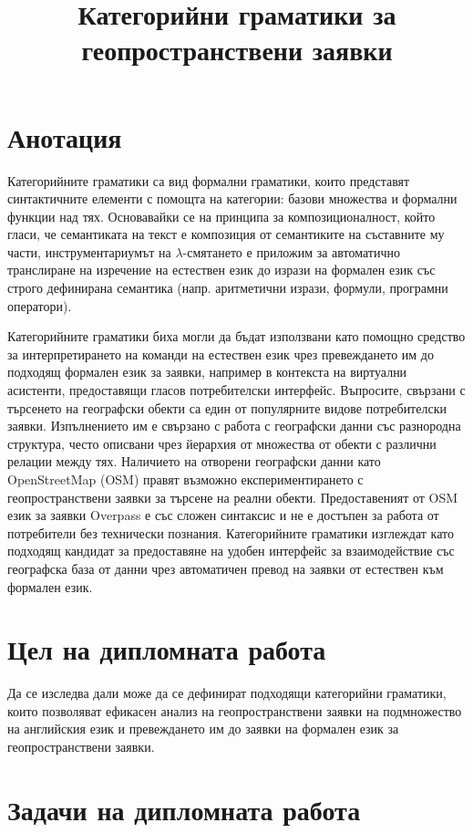 \documentclass[11pt,a4paper]{article}
\title{Категорийни граматики за геопространствени заявки}
\begin{document}
\maketitle

\section*{Анотация}

Категорийните граматики са вид формални граматики, които представят синтактичните елементи с помощта на категории: базови множества и формални функции над тях. Основавайки се на принципа за композиционалност, който гласи, че семантиката на текст е композиция от семантиките на съставните му части, инструментариумът на $\lambda$-смятането е приложим за автоматично транслиране на изречение на естествен език до изрази на формален език със строго дефинирана семантика (напр. аритметични изрази, формули, програмни оператори).

Категорийните граматики биха могли да бъдат използвани като помощно средство за интерпретирането на команди на естествен език чрез превеждането им до подходящ формален език за заявки, например в контекста на виртуални асистенти, предоставящи гласов потребителски интерфейс. Въпросите, свързани с търсенето на географски обекти са един от популярните видове потребителски заявки. Изпълнението им е свързано с работа с географски данни със разнородна структура, често описвани чрез йерархия от множества от обекти с различни релации между тях. Наличието на отворени географски данни като OpenStreetMap (OSM) правят възможно експериментирането с геопространствени заявки за търсене на реални обекти. Предоставеният от OSM език за заявки Overpass е със сложен синтаксис и не е достъпен за работа от потребители без технически познания. Категорийните граматики изглеждат като подходящ кандидат за предоставяне на удобен интерфейс за взаимодействие със географска база от данни чрез автоматичен превод на заявки от естествен към формален език.

\section*{Цел на дипломната работа}
Да се изследва дали може да се дефинират подходящи категорийни граматики, които позволяват ефикасен анализ на геопространствени заявки на подмножество на английския език и превеждането им до заявки на формален език за геопространствени заявки.

\section*{Задачи на дипломната работа}
\end{document}
